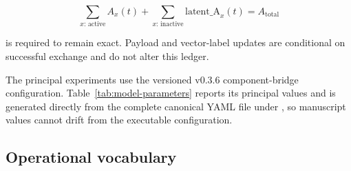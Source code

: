 \begin{equation}
\sum_{x:\,\mathrm{active}} A_x(t)
+\sum_{x:\,\mathrm{inactive}}\mathrm{latent\_A}_x(t)
=A_{\mathrm{total}}
\label{eq:amplitude-ledger}
\end{equation}

is required to remain exact. Payload and vector-label updates are conditional
on successful exchange and do not alter this ledger.

The principal experiments use the versioned v0.3.6 component-bridge
configuration. Table~\ref{tab:model-parameters} reports its principal values
and is generated directly from the complete canonical YAML file under
, so manuscript values cannot drift from the
executable configuration.



\subsection{Operational vocabulary}


